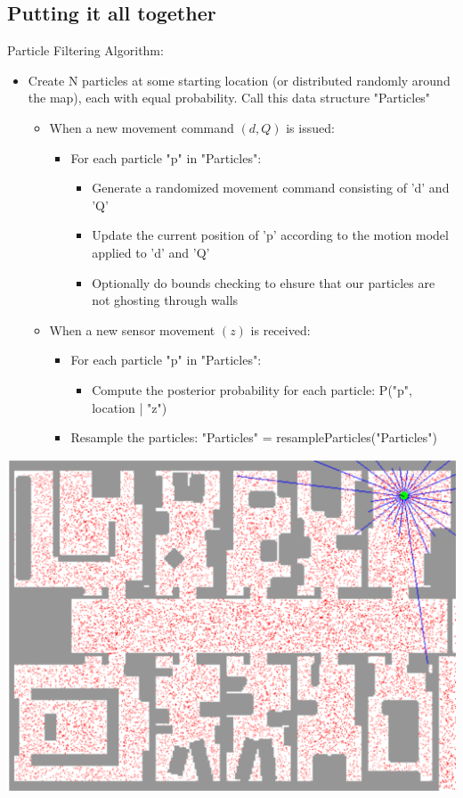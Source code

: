 \documentclass[10pt]{article}
\begin{document}
\subsection*{Putting it all together}
Particle Filtering Algorithm:
\begin{itemize}
	\item Create N particles at some starting location (or distributed randomly around the map), each with equal probability.  Call this data structure "Particles"
	\begin{itemize}
        \item When a new movement command $(d, Q)$ is issued:
        \begin{itemize}
            \item For each particle "p" in "Particles":
            \begin{itemize}
                \item Generate a randomized movement command consisting of 'd' and 'Q'
                \item Update the current position of 'p' according to the motion model applied to 'd' and 'Q'
                \item Optionally do bounds checking to ehsure that our particles are not ghosting through walls
            \end{itemize}
        \end{itemize}
        \item When a new sensor movement $(z)$ is received:
        \begin{itemize}
            \item For each particle "p" in "Particles":
            \begin{itemize}
                \item Compute the posterior probability for each particle: P("p", location | "z")
            \end{itemize}
            \item Resample the particles: "Particles" = resampleParticles("Particles")
        \end{itemize}
    \end{itemize}
\end{itemize}
\begin{center} 
	\includegraphics*[width=\textwidth]{L1_13.png} 
\end{center}
\end{document}
